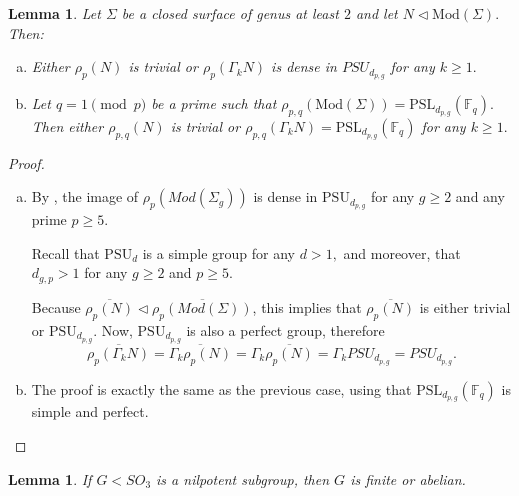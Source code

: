 \documentclass[12pt]{amsart}
\newtheorem{lem}[thm]{Lemma}
\theoremstyle{definition}
\begin{document}
\begin{lem}\label{lem:SimplePerfect}
	Let $\Sigma$ be a closed surface of genus at least $2$ and let $N\triangleleft \mathrm{Mod}(\Sigma).$  Then:
	
	\begin{enumerate}[(a)]
		
		
		\item Either $\rho_p( N)$ is trivial or $\rho_p(\Gamma_k N)$ is dense in $PSU_{d_{p,g}}$ for any $k\geq 1.$
		\item Let $q=1 \pmod{ p}$ be a prime such that $\rho_{p,q}(\mathrm{Mod}(\Sigma))=\mathrm{PSL}_{d_{p,g}}(\mathbb{F}_q).$ Then either $\rho_{p,q}(N)$ is trivial or $\rho_{p,q}(\Gamma_k N)=\mathrm{PSL}_{d_{p,g}}(\mathbb{F}_q)$ for any $k\geq 1.$
	\end{enumerate}	
\end{lem}
\begin{proof}
	\begin{enumerate}[(a)]
		\item By \cite{LW05}, the image of $\rho_p( Mod(\Sigma_g))$ is dense in $\mathrm{PSU}_{d_{p,g}}$ for any $g\geq 2$ and any prime $p\geq 5.$ 
		
		Recall that $\mathrm{PSU}_d$ is a simple group for any $d>1,$ and moreover, that $d_{g,p}>1$ for any $g\geq 2$ and $p\geq 5.$ 
		
		Because $\overline{\rho_p(N)}\triangleleft \overline{\rho_p(Mod(\Sigma))}$, this implies that $\overline{\rho_p(N)}$ is either trivial or $\mathrm{PSU}_{d_{p,g}}$.
		Now, $\mathrm{PSU}_{d_{p,g}}$ is also a perfect group, therefore $$\overline{\rho_p(\Gamma_k N)}=\overline{\Gamma_k \rho_p(N)}=\Gamma_k \overline{\rho_p(N)}=\Gamma_k PSU_{d_{p,g}}=PSU_{d_{p,g}}.$$
		
		
		\item The proof is exactly the same as the previous case, using that $\mathrm{PSL}_{d_{p,g}}(\mathbb{F}_q)$ is simple and perfect.
	\end{enumerate}
\end{proof}
\iffalse
\begin{lem}\label{lem:nilpotentso3}
	If $G<SO_3$ is a nilpotent subgroup, then $G$ is finite or abelian.
\end{lem}
\end{document}
